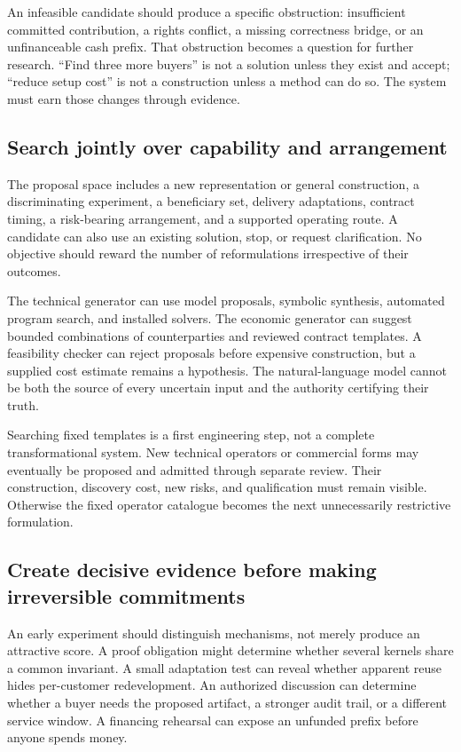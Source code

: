 \documentclass[11pt,letterpaper]{article}
\theoremstyle{remark}\newtheorem{remark}{Remark}[section]
\begin{document}
An infeasible candidate should produce a specific obstruction: insufficient committed contribution, a rights conflict, a missing correctness bridge, or an unfinanceable cash prefix. That obstruction becomes a question for further research. ``Find three more buyers'' is not a solution unless they exist and accept; ``reduce setup cost'' is not a construction unless a method can do so. The system must earn those changes through evidence.

\subsection{Search jointly over capability and arrangement}
The proposal space includes a new representation or general construction, a discriminating experiment, a beneficiary set, delivery adaptations, contract timing, a risk-bearing arrangement, and a supported operating route. A candidate can also use an existing solution, stop, or request clarification. No objective should reward the number of reformulations irrespective of their outcomes.

The technical generator can use model proposals, symbolic synthesis, automated program search, and installed solvers. The economic generator can suggest bounded combinations of counterparties and reviewed contract templates. A feasibility checker can reject proposals before expensive construction, but a supplied cost estimate remains a hypothesis. The natural-language model cannot be both the source of every uncertain input and the authority certifying their truth.

Searching fixed templates is a first engineering step, not a complete transformational system. New technical operators or commercial forms may eventually be proposed and admitted through separate review. Their construction, discovery cost, new risks, and qualification must remain visible. Otherwise the fixed operator catalogue becomes the next unnecessarily restrictive formulation.

\subsection{Create decisive evidence before making irreversible commitments}
An early experiment should distinguish mechanisms, not merely produce an attractive score. A proof obligation might determine whether several kernels share a common invariant. A small adaptation test can reveal whether apparent reuse hides per-customer redevelopment. An authorized discussion can determine whether a buyer needs the proposed artifact, a stronger audit trail, or a different service window. A financing rehearsal can expose an unfunded prefix before anyone spends money.
\end{document}
